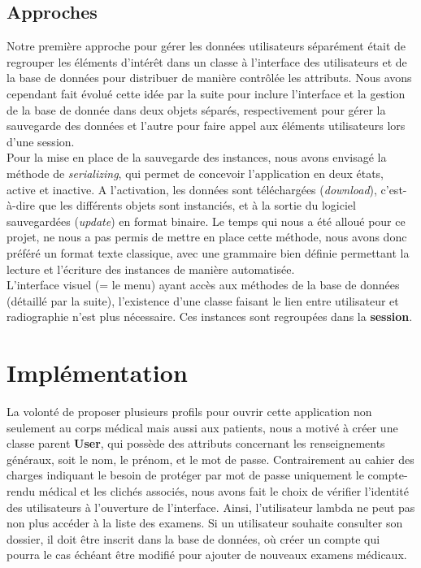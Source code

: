\documentclass[12pt,a4paper]{article}
\begin{document}
\begin{multicols}{2}
		\subsection{Approches}
		
		Notre première approche pour gérer les données utilisateurs séparément était de regrouper les éléments d'intérêt dans un classe à l'interface des utilisateurs et de la base de données pour distribuer de manière contrôlée les attributs. Nous avons cependant fait évolué cette idée par la suite pour inclure l'interface et la gestion de la base de donnée dans deux objets séparés, respectivement pour gérer la sauvegarde des données et l'autre pour faire appel aux éléments utilisateurs lors d'une session. \\
				
		Pour la mise en place de la sauvegarde des instances, nous avons envisagé la méthode de \textit{serializing}, qui permet de concevoir l'application en deux états, active et inactive. A l'activation, les données sont téléchargées (\textit{download}), c'est-à-dire que les différents objets sont instanciés, et à la sortie du logiciel sauvegardées (\textit{update}) en format binaire. Le temps qui nous a été alloué pour ce projet, ne nous a pas permis de mettre en place cette méthode, nous avons donc préféré un format texte classique, avec une grammaire bien définie permettant la lecture et l'écriture des instances de manière automatisée.\\
				
		L'interface visuel (= le \og menu\fg{}) ayant accès aux méthodes de la base de données (détaillé par la suite), l'existence d'une classe faisant le lien entre utilisateur et radiographie n'est plus nécessaire. Ces instances sont regroupées dans la \textbf{session}.
		
		
		
				
		\section{Implémentation}
				
		La volonté de proposer plusieurs profils pour ouvrir cette application non seulement au corps médical mais aussi aux patients, nous a motivé à créer une classe parent \textbf{User}, qui possède des attributs concernant les renseignements généraux, soit le nom, le prénom, et le mot de passe. Contrairement au cahier des charges indiquant le besoin de protéger par mot de passe uniquement le compte-rendu médical et les clichés associés, nous avons fait le choix de vérifier l'identité des utilisateurs à l'ouverture de l'interface. Ainsi, l'utilisateur lambda ne peut pas non plus accéder à la liste des examens. Si un utilisateur souhaite consulter son dossier, il doit être inscrit dans la base de données, où créer un compte qui pourra le cas échéant être modifié pour ajouter de nouveaux examens médicaux.\\
		

\end{multicols}
\end{document}
